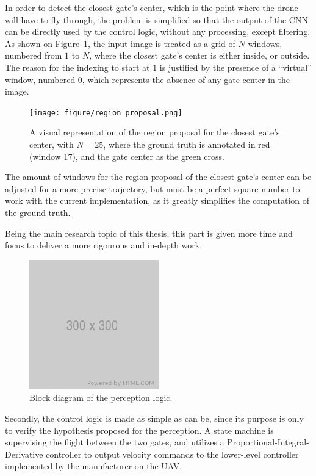 In order to detect the closest gate's center, which is the point where the
drone will have to fly through, the problem is simplified so that the output of
the CNN can be directly used by the control logic, without any processing,
except filtering. As shown on Figure~\ref{fig:regionproposal}, the input image
is treated as a grid of $N$ windows, numbered from $1$ to $N$, where the
closest gate's center is either inside, or outside. The reason for the indexing
to start at $1$ is justified by the presence of a ``virtual'' window, numbered
$0$, which represents the absence of any gate center in the image.

\begin{figure}[h!]
	\center
	\texttt{[image: figure/region\_proposal.png]}
	\caption{A visual representation of the region proposal for the closest
		gate's center, with $N=25$, where the ground truth is annotated in red
		(window 17), and the gate center as the green cross.}
	\label{fig:regionproposal}
\end{figure}

The amount of windows for the region proposal of the closest gate's center can
be adjusted for a more precise trajectory, but must be a perfect square number
to work with the current implementation, as it greatly simplifies the
computation of the ground truth.

Being the main research topic of this thesis, this part is given more time and
focus to deliver a more rigourous and in-depth work.\\

\begin{figure}[h]
	\centering
	\includegraphics[width=0.5\textwidth]{figure/300x300.png}
	\caption{Block diagram of the perception logic.}
	\label{fig:perception-block}
\end{figure}

Secondly, the control logic is made as simple as can be, since its purpose is
only to verify the hypothesis proposed for the perception. A state machine is
supervising the flight between the two gates, and utilizes a
Proportional-Integral-Derivative controller to output velocity commands to the
lower-level controller implemented by the manufacturer on the UAV.\\


